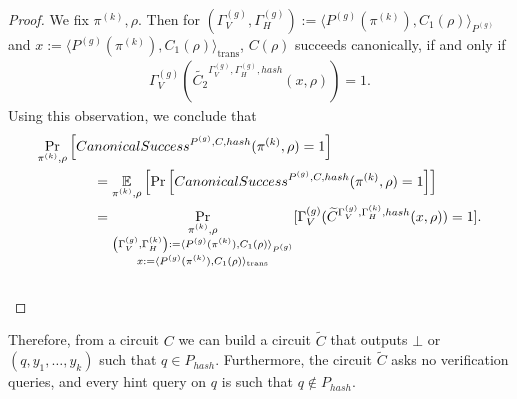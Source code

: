 \begin{proof}
We fix $\pi^{(k)}, \rho$. Then for $(\Gamma_V^{(g)}, \Gamma_H^{(g)}) := \langle P^{(g)}(\pi^{(k)}), C_1(\rho) \rangle_{P^{(g)}}$ and
$x := \langle P^{(g)}(\pi^{(k)}), C_1(\rho) \rangle_{\text{trans}}$, $C(\rho)$ succeeds canonically, if and only if
\begin{align*}
\Gamma_V^{(g)} (\widetilde{C_2}^{\Gamma_V^{(g)}, \Gamma_H^{(g)}, hash}(x, \rho)) = 1.
\end{align*}
Using this observation, we conclude that
\begin{align*}
  &\underset{\pi^{(k)}, \rho}{\Pr}\left[CanonicalSuccess^{P^{(g)}, C, hash}(\pi^{(k)}, \rho) = 1\right] \\
  &\mbox\qquad\qquad = \underset{\pi^{(k)}, \rho}{\mathbb{E}}\left[\underset{}{\Pr}\left[CanonicalSuccess^{P^{(g)}, C, hash}(\pi^{(k)}, \rho) = 1\right]\right] \\
  &\mbox\qquad\qquad = \underset{\substack{\pi^{(k)}, \rho \\
      \left(\Gamma_V^{(g)}, \Gamma_H^{(k)}\right) := \langle P^{(g)}(\pi^{(k)}), C_1(\rho) \rangle_{P^{(g)}} \\
      x := \langle P^{(g)}(\pi^{(k)}), C_1(\rho) \rangle_{\text{trans}}}}
  {\Pr}[\Gamma_V^{(g)} (\widetilde{C}^{\Gamma_V^{(g)}, \Gamma_H^{(k)}, hash}(x, \rho)) = 1].
\end{align*}
\\\text{  }
\end{proof}
%
Therefore, from a circuit $C$ we can build a circuit $\widetilde{C}$ that outputs $\bot$ or $(q, y_1, \dots, y_k)$ such that $q \in P_{hash}$.
Furthermore, the circuit $\widetilde{C}$ asks no verification queries, and every hint query on $q$ is such that $q \notin P_{hash}$.
%
